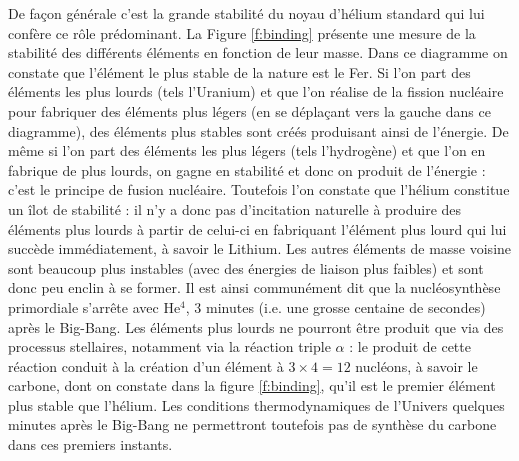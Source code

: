 De façon générale c'est la grande stabilité du noyau d'hélium standard qui lui confère ce rôle prédominant. La Figure \ref{f:binding} présente une mesure de la stabilité des différents éléments en fonction de leur masse. Dans ce diagramme on constate que l'élément le plus stable de la nature est le Fer. Si l'on part des éléments les plus lourds (tels l'Uranium) et que l'on réalise de la fission nucléaire pour fabriquer des éléments plus légers (en se déplaçant vers la gauche dans ce diagramme), des éléments plus stables sont créés produisant ainsi de l'énergie. De même si l'on part des éléments les plus légers (tels l'hydrogène) et que l'on en fabrique de plus lourds, on gagne en stabilité et donc on produit de l'énergie : c'est le principe de fusion nucléaire. Toutefois l'on constate que l'hélium constitue un îlot de stabilité : il n'y a donc pas d'incitation naturelle à produire des éléments plus lourds à partir de celui-ci en fabriquant l'élément plus lourd qui lui succède immédiatement, à savoir le Lithium. Les autres éléments de masse voisine sont beaucoup plus instables (avec des énergies de liaison plus faibles) et sont donc peu enclin à se former. Il est ainsi communément dit que la nucléosynthèse primordiale s'arrête avec He$^4$, 3 minutes (i.e. une grosse centaine de secondes) après le Big-Bang. Les éléments plus lourds ne pourront être produit que via des processus stellaires, notamment via la réaction triple $\alpha$ :  le produit de cette réaction conduit à la création d'un élément à $3\times 4= 12$ nucléons, à savoir le carbone, dont on constate dans la figure \ref{f:binding}, qu'il est le premier élément plus stable que l'hélium. Les conditions thermodynamiques de l'Univers quelques minutes après le Big-Bang ne permettront toutefois pas de synthèse du carbone dans ces premiers instants.

